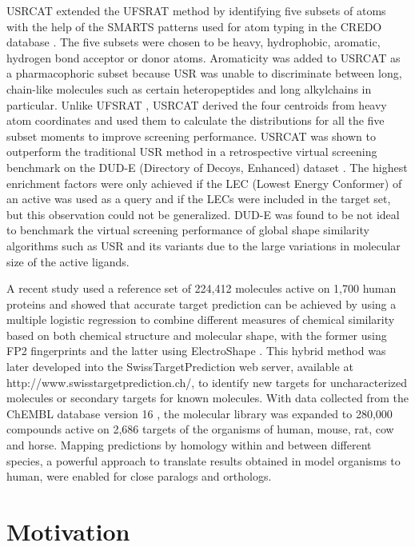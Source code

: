 USRCAT \citep{1331} extended the UFSRAT \citep{1436} method by identifying five subsets of atoms with the help of the SMARTS patterns used for atom typing in the CREDO database \citep{522,1530}. The five subsets were chosen to be heavy, hydrophobic, aromatic, hydrogen bond acceptor or donor atoms. Aromaticity was added to USRCAT as a pharmacophoric subset because USR was unable to discriminate between long, chain-like molecules such as certain heteropeptides and long alkylchains in particular. Unlike UFSRAT \citep{1436}, USRCAT \citep{1331} derived the four centroids from heavy atom coordinates and used them to calculate the distributions for all the five subset moments to improve screening performance. USRCAT was shown to outperform the traditional USR method in a retrospective virtual screening benchmark on the DUD-E (Directory of Decoys, Enhanced) dataset \citep{1185}. The highest enrichment factors were only achieved if the LEC (Lowest Energy Conformer) of an active was used as a query and if the LECs were included in the target set, but this observation could not be generalized. DUD-E was found to be not ideal to benchmark the virtual screening performance of global shape similarity algorithms such as USR and its variants due to the large variations in molecular size of the active ligands.

A recent study \citep{1407} used a reference set of 224,412 molecules active on 1,700 human proteins and showed that accurate target prediction can be achieved by using a multiple logistic regression to combine different measures of chemical similarity based on both chemical structure and molecular shape, with the former using FP2 fingerprints and the latter using ElectroShape \citep{1338}. This hybrid method was later developed into the SwissTargetPrediction \citep{1408} web server, available at http://www.swisstargetprediction.ch/, to identify new targets for uncharacterized molecules or secondary targets for known molecules. With data collected from the ChEMBL database version 16 \citep{1441}, the molecular library was expanded to 280,000 compounds active on 2,686 targets of the organisms of human, mouse, rat, cow and horse. Mapping predictions by homology within and between different species, a powerful approach to translate results obtained in model organisms to human, were enabled for close paralogs and orthologs.

\section{Motivation}

